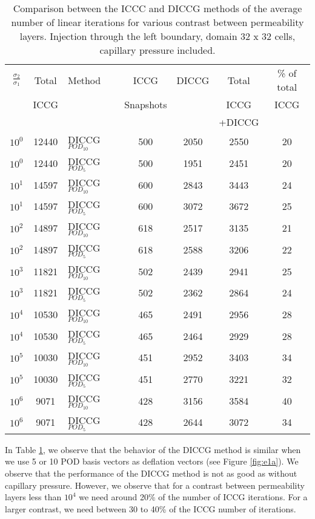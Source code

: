 \documentclass[12pt]{article}
\begin{document}
\begin{table}[!h]\centering
\begin{minipage}{1\textwidth}
 \centering
\begin{tabular}{ ||c|c||l|c|c|c|c||} 
\hline
$\frac{\sigma_2}{\sigma_1}$&Total&Method  & ICCG&DICCG &Total&\% of total\\ 
                           & ICCG     &  & Snapshots& &ICCG& ICCG\\ 
                            &     &  & & &+DICCG& \\
\hline  
$10^{0}$ &12440& DICCG$_{POD_{10}}$&500&2050&2550&20 \\ 
\hline  
$10^{0}$ &12440& DICCG$_{POD_{5}}$&500&1951&2451&20 \\ 
\hline 
$10^{1}$ &14597& DICCG$_{POD_{10}}$&600&2843&3443&24 \\ 
\hline  
$10^{1}$ &14597& DICCG$_{POD_{5}}$&600&3072&3672&25 \\ 
\hline 
$10^{2}$ &14897& DICCG$_{POD_{10}}$&618&2517&3135&21 \\ 
\hline  
$10^{2}$ &14897& DICCG$_{POD_{5}}$&618&2588&3206&22 \\ 
\hline  
$10^{3}$ &11821& DICCG$_{POD_{10}}$&502&2439&2941&25 \\ 
\hline  
$10^{3}$ &11821& DICCG$_{POD_{5}}$&502&2362&2864&24 \\ 
\hline 
$10^{4}$ &10530& DICCG$_{POD_{10}}$&465&2491&2956&28 \\ 
\hline  
$10^{4}$ &10530& DICCG$_{POD_{5}}$&465&2464&2929&28 \\ 
\hline 
$10^{5}$ &10030& DICCG$_{POD_{10}}$&451&2952&3403&34 \\ 
\hline  
$10^{5}$ &10030& DICCG$_{POD_{5}}$&451&2770&3221&32 \\ 
\hline 
$10^{6}$ &9071& DICCG$_{POD_{10}}$&428&3156&3584&40 \\ 
\hline  
$10^{6}$ &9071& DICCG$_{POD_{5}}$&428&2644&3072&34 \\ 
\hline  
\end{tabular} 
\caption{Comparison between the ICCC and DICCG methods of the average number of linear iterations for various contrast between permeability layers. Injection through the left boundary, domain 32 x 32 cells, capillary pressure included.}\label{table:liter1a} 
\end{minipage}  
\end{table}  
In Table \ref{table:liter1a}, we observe that the behavior of the DICCG method is similar when we use 5 or 10 POD basis vectors as deflation vectors (see Figure \ref{fig:e1a}). We observe that the performance of the DICCG method is not as good as without capillary pressure. However, we observe that for a contrast between permeability layers less than $10^4$ we need around 20\% of the number of ICCG iterations. For a larger contrast, we need between 30 to 40\% of the ICCG number of iterations. 
\end{document}
